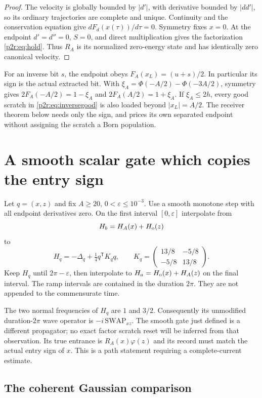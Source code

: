 \documentclass[11pt]{article}
\numberwithin{equation}{section}
\theoremstyle{definition}
\theoremstyle{remark}
\begin{document}
\begin{proof}
The velocity is globally bounded by $|d'|$, with derivative bounded
by $|dd'|$, so its ordinary trajectories are complete and unique.
Continuity and the conservation equation give
$dF_d(x(\tau))/d\tau=0$. Symmetry fixes $x=0$.
At the endpoint $d'=d''=0$, $S=0$, and direct multiplication gives
the factorization \eqref{p2r:eq:hold}. Thus $R_A$ is its normalized
zero-energy state and has identically zero canonical velocity.
\end{proof}

For an inverse bit $s$, the endpoint obeys
$F_A(x_L)=(u+s)/2$. In particular its sign is the actual extracted
bit. With
$\xi_A=\Phi(-A/2)-\Phi(-3A/2)$, symmetry gives
$2F_A(-A/2)=1-\xi_A$ and $2F_A(A/2)=1+\xi_A$.
If $\xi_A\leq2h$, every good scratch in
\eqref{p2r:eq:inversegood} is also loaded beyond $|x_L|=A/2$.
The receiver theorem below needs only the sign, and prices its own
separated endpoint without assigning the scratch a Born population.

\section{A smooth scalar gate which copies the entry sign}
\label{p2r:sec:copy}

Let $q=(x,z)$ and fix $A\geq20$, $0<\varepsilon\leq10^{-3}$.
Use a smooth monotone step with all endpoint derivatives zero.
On the first interval $[0,\varepsilon]$ interpolate from
\[
 H_b=H_A(x)+H_{\rm o}(z)
\]
to
\[
 H_q=-\Delta_q+\tfrac14q^\mathsf TK_q q,\qquad
 K_q=\begin{pmatrix}13/8&-5/8\\-5/8&13/8\end{pmatrix}.
\]
Keep $H_q$ until $2\pi-\varepsilon$, then interpolate to
$H_a=H_{\rm o}(x)+H_A(z)$ on the final interval.
The ramp intervals are contained in the duration $2\pi$.
They are not appended to the commensurate time.

The two normal frequencies of $H_q$ are $1$ and $3/2$.
Consequently its unmodified duration-$2\pi$ wave operator is
$-i\,\mathrm{SWAP}_{xz}$. The smooth gate just defined is a
different propagator; no exact factor scratch reset will be inferred
from that observation. Its true entrance is
$R_A(x)\varphi(z)$ and its record must match the actual entry sign
of $x$. This is a path statement requiring a complete-current estimate.

\subsection{The coherent Gaussian comparison}
\end{document}
